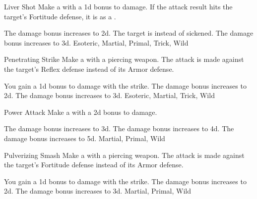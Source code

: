 \lowercase{\hypertarget{maneuver:Liver Shot}{}}\label{maneuver:Liver Shot}
\hypertarget{maneuver:Liver Shot}{}
\begin{apability}{Liver Shot}
Make a  with a \plus1d bonus to damage.
If the attack result hits the target's Fortitude defense,
it is  as a .

\rankline
{} The damage bonus increases to \plus2d.
 The target is  instead of sickened.
 The damage bonus increases to \plus3d.
 Esoteric, Martial, Primal, Trick, Wild
\end{apability}
\vspace{0.25em}



\lowercase{\hypertarget{maneuver:Penetrating Strike}{}}\label{maneuver:Penetrating Strike}
\hypertarget{maneuver:Penetrating Strike}{}
\begin{apability}{Penetrating Strike}
Make a  with a piercing weapon.
The attack is made against the target's Reflex defense instead of its Armor defense.

\rankline
{} You gain a \plus1d bonus to damage with the strike.
 The damage bonus increases to \plus2d.
 The damage bonus increases to \plus3d.
 Esoteric, Martial, Trick, Wild
\end{apability}
\vspace{0.25em}



\lowercase{\hypertarget{maneuver:Power Attack}{}}\label{maneuver:Power Attack}
\hypertarget{maneuver:Power Attack}{}
\begin{apability}{Power Attack}
Make a  with a \plus2d bonus to damage.

\rankline
{} The damage bonus increases to \plus3d.
 The damage bonus increases to \plus4d.
 The damage bonus increases to \plus5d.
 Martial, Primal, Wild
\end{apability}
\vspace{0.25em}



\lowercase{\hypertarget{maneuver:Pulverizing Smash}{}}\label{maneuver:Pulverizing Smash}
\hypertarget{maneuver:Pulverizing Smash}{}
\begin{apability}{Pulverizing Smash}
Make a  with a piercing weapon.
The attack is made against the target's Fortitude defense instead of its Armor defense.

\rankline
{} You gain a \plus1d bonus to damage with the strike.
 The damage bonus increases to \plus2d.
 The damage bonus increases to \plus3d.
 Martial, Primal, Wild
\end{apability}
\vspace{0.25em}



